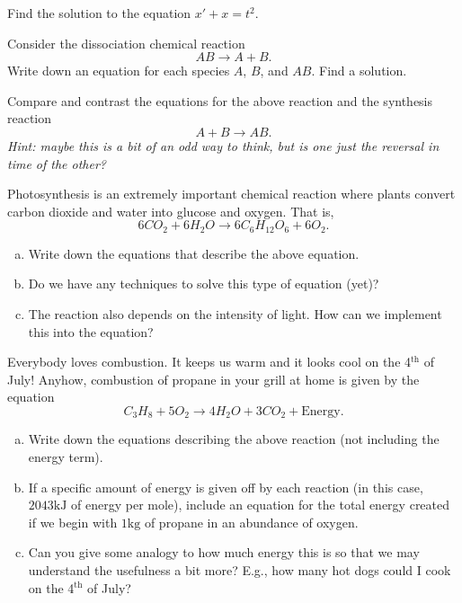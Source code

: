 \documentclass[12pt]{article} %
\begin{document}
\begin{problem}
    Find the solution to the equation $x'+x=t^2$.
\end{problem}

\begin{problem}
    Consider the dissociation chemical reaction
    \[
        AB \to A + B.
    \]
    Write down an equation for each species $A$, $B$, and $AB$.  Find a solution.
\end{problem}

\begin{problem}
    Compare and contrast the equations for the above reaction and the synthesis reaction
    \[
        A+B \to AB.
    \]
    \emph{Hint: maybe this is a bit of an odd way to think, but is one just the reversal in time of the other?}
\end{problem}

\begin{problem}
    Photosynthesis is an extremely important chemical reaction where plants convert carbon dioxide and water into glucose and oxygen. That is,
    \[
        6CO_2 + 6H_2O \to 6C_6 H_{12} O_6 + 6 O_2.
    \]
    \begin{enumerate}[(a)]
        \item Write down the equations that describe the above equation.
        \item Do we have any techniques to solve this type of equation (yet)?
        \item The reaction also depends on the intensity of light.  How can we implement this into the equation?
    \end{enumerate}   
\end{problem}

\begin{problem}
Everybody loves combustion. It keeps us warm and it looks cool on the 4$^\textrm{th}$ of July!  Anyhow, combustion of propane in your grill at home is given by the equation
    \[
        C_3 H_8 + 5O_2 \to 4H_2O + 3CO_2 + \textrm{Energy}.
    \]
    \begin{enumerate}[(a)]
        \item Write down the equations describing the above reaction (not including the energy term).
        \item If a specific amount of energy is given off by each reaction (in this case, $2043\textrm{kJ}$ of energy per mole), include an equation for the total energy created if we begin with $1\textrm{kg}$ of propane in an abundance of oxygen.
        \item Can you give some analogy to how much energy this is so that we may understand the usefulness a bit more? E.g., how many hot dogs could I cook on the 4$^\textrm{th}$ of July?
    \end{enumerate}

\end{problem}
\end{document}
